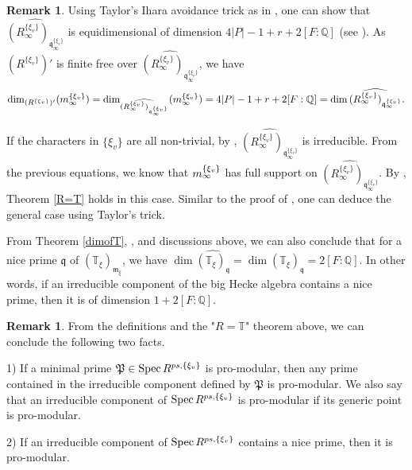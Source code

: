 \documentclass[12pt]{amsart}
\theoremstyle{plain}
\theoremstyle{definition}
\newtheorem{rem}[thm]{Remark}
\theoremstyle{remark}
\begin{document}
\begin{rem}
	Using Taylor's Ihara avoidance trick as in \cite{PMIHES_2008__108__183_0}, one can show that  
	$\widehat{(R_{\infty}^{\{\xi_v\}})_{\mathfrak{q}_{\infty}^{\{\xi_v\}}}}$ is equidimensional of dimension $ 4|P|-1 +r+2[F:\mathbb{Q}]$ (see \cite[Section 4.2, Lemma 4.8.2]{pan2022fontaine}). As $(R^{\{\xi_v\}})'$ is finite free over $\widehat{(R_{\infty}^{\{\xi_v\}})_{\mathfrak{q}_{\infty}^{\{\xi_v\}}}}$, we have $$\operatorname{dim}_{(R^{\{\xi_v\}})'}(\textnormal{m}_\infty^{\{\xi_v\}})=\operatorname{dim}_{\widehat{(R_{\infty}^{\{\xi_v\}})_{\mathfrak{q}_{\infty}^{\{\xi_v\}}}}}(\textnormal{m}_\infty^{\{\xi_v\}})=4|P|-1 +r+2[F:\mathbb{Q}]= \operatorname{dim} \widehat{(R_{\infty}^{\{\xi_v\}})_{\mathfrak{q}_{\infty}^{\{\xi_v\}}}}.$$
	
	If the characters in $\{\xi_v\}$ are all non-trivial, by \cite[Proposition 4.2.3]{pan2022fontaine},  $\widehat{(R_{\infty}^{\{\xi_v\}})_{\mathfrak{q}_{\infty}^{\{\xi_v\}}}}$ is irreducible. From the previous equations, we know that $\textnormal{m}_\infty^{\{\xi_v\}} $ has full support on $\widehat{(R_{\infty}^{\{\xi_v\}})_{\mathfrak{q}_{\infty}^{\{\xi_v\}}}}$. By \cite[Lemma 4.8.4]{pan2022fontaine}, Theorem \ref{R=T} holds in this case. Similar to the proof of \cite[Theorem 4.1]{PMIHES_2008__108__183_0}, one can deduce the general case using Taylor's trick.
	
	From Theorem \ref{dimofT}, \cite[Corollary 12.5]{eisenbud2013commutative}, and discussions above, we can also conclude that for a nice prime $\mathfrak{q}$ of $(\mathbb{T}_{\xi})_{\mathfrak{m}_{\xi}}$, we have $\operatorname{dim} \widehat{(\mathbb{T}_{\xi})_{\mathfrak{q}}} =\operatorname{dim} (\mathbb{T}_{\xi})_{\mathfrak{q}}= 2[F:\mathbb{Q}]$. In other words, if an irreducible component of the big Hecke algebra contains a nice prime, then it is of dimension $1+2[F:\mathbb{Q}]$.
\end{rem}

\begin{rem}\label{remark}
	From the definitions and the "$R=\mathbb{T}$" theorem above, we can conclude the following two facts.
	
	1) If a minimal prime $\mathfrak{P} \in \operatorname{Spec} R^{\textnormal{ps}, \{\xi_v\}}$ is pro-modular, then any prime contained in the irreducible component defined by $\mathfrak{P}$ is pro-modular. We also say that an irreducible component of $\operatorname{Spec} R^{\textnormal{ps}, \{\xi_v\}}$ is pro-modular if its generic point is pro-modular.
	
	2) If an irreducible component of $\operatorname{Spec} R^{\textnormal{ps}, \{\xi_v\}}$ contains a nice prime, then it is pro-modular.
\end{rem}
\end{document}
